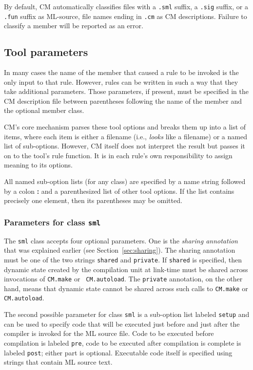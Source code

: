 By default, CM automatically classifies files with a {\tt .sml}
suffix, a {\tt .sig} suffix, or a {\tt .fun} suffix as ML-source, file
names ending in {\tt .cm} as CM descriptions.  Failure to classify a
member will be reported as an error.

\subsection{Tool parameters}
\label{sec:toolparam}

In many cases the name of the member that caused a rule to be invoked
is the only input to that rule.  However, rules can be written in such
a way that they take additional parameters.  Those parameters, if
present, must be specified in the CM description file between
parentheses following the name of the member and the optional member
class.

CM's core mechanism parses these tool options and breaks them up into
a list of items, where each item is either a filename (i.e., {\em
looks} like a filename) or a named list of sub-options.  However, CM
itself does not interpret the result but passes it on to the tool's
rule function.  It is in each rule's own responsibility to assign
meaning to its options.

All named sub-option lists (for any class) are specified by a name
string followed by a colon {\bf :} and a parenthesized list of other
tool options.  If the list contains precisely one element, then its
parentheses may be omitted.

\subsubsection{Parameters for class {\tt sml}}
\label{sec:toolparam:sml}

The {\tt sml} class accepts four optional parameters.  One is the {\em
sharing annotation} that was explained earlier (see
Section~\ref{sec:sharing}).  The sharing annotation must be one of the
two strings {\tt shared} and {\tt private}.  If {\tt shared} is
specified, then dynamic state created by the compilation unit at
link-time must be shared across invocations of {\tt CM.make} or {\tt
CM.autoload}.  The {\tt private} annotation, on the other hand, means
that dynamic state cannot be shared across such calls to {\tt CM.make}
or {\tt CM.autoload}.

The second possible parameter for class {\tt sml} is a sub-option
list labeled {\tt setup} and can be used to specify code that will be
executed just before and just after the compiler is invoked for the
ML source file.  Code to be executed before compilation is labeled
{\tt pre}, code to be executed after compilation is complete is
labeled {\tt post}; either part is optional.  Executable code itself
is specified using strings that contain ML source text.

